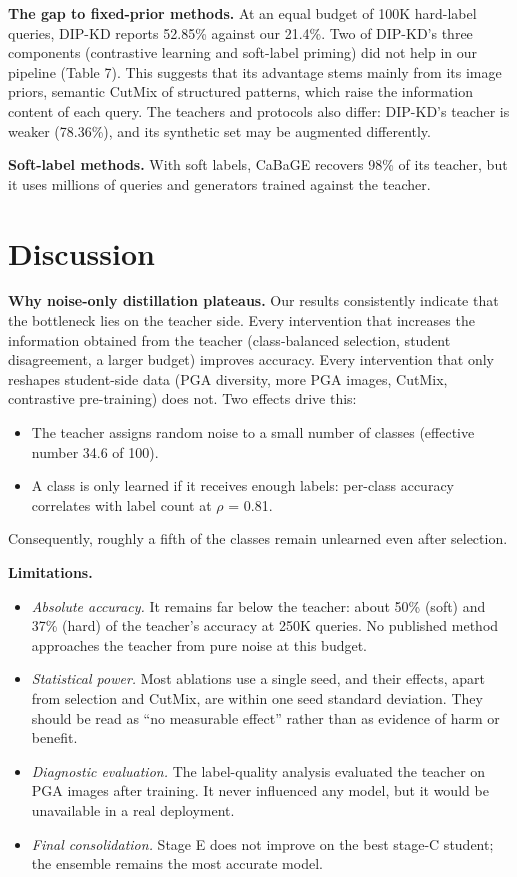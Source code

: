 \documentclass[
  10pt,
]{article}
\providecommand{\tightlist}{%
  \setlength{\itemsep}{0pt}\setlength{\parskip}{0pt}}
\begin{document}
\textbf{The gap to fixed-prior methods.} At an equal budget of 100K
hard-label queries, DIP-KD reports 52.85\% against our 21.4\%. Two of
DIP-KD's three components (contrastive learning and soft-label priming)
did not help in our pipeline (Table 7). This suggests that its advantage
stems mainly from its image priors, semantic CutMix of structured
patterns, which raise the information content of each query. The
teachers and protocols also differ: DIP-KD's teacher is weaker
(78.36\%), and its synthetic set may be augmented differently.

\textbf{Soft-label methods.} With soft labels, CaBaGE recovers 98\% of
its teacher, but it uses millions of queries and generators trained
against the teacher.

\hypertarget{discussion}{%
\section{Discussion}\label{discussion}}

\textbf{Why noise-only distillation plateaus.} Our results consistently
indicate that the bottleneck lies on the teacher side. Every
intervention that increases the information obtained from the teacher
(class-balanced selection, student disagreement, a larger budget)
improves accuracy. Every intervention that only reshapes student-side
data (PGA diversity, more PGA images, CutMix, contrastive pre-training)
does not. Two effects drive this:

\begin{itemize}
\tightlist
\item
  The teacher assigns random noise to a small number of classes
  (effective number 34.6 of 100).
\item
  A class is only learned if it receives enough labels: per-class
  accuracy correlates with label count at \(\rho\) = 0.81.
\end{itemize}

Consequently, roughly a fifth of the classes remain unlearned even after
selection.

\textbf{Limitations.}

\begin{itemize}
\tightlist
\item
  \emph{Absolute accuracy.} It remains far below the teacher: about 50\%
  (soft) and 37\% (hard) of the teacher's accuracy at 250K queries. No
  published method approaches the teacher from pure noise at this
  budget.
\item
  \emph{Statistical power.} Most ablations use a single seed, and their
  effects, apart from selection and CutMix, are within one seed standard
  deviation. They should be read as ``no measurable effect'' rather than
  as evidence of harm or benefit.
\item
  \emph{Diagnostic evaluation.} The label-quality analysis evaluated the
  teacher on PGA images after training. It never influenced any model,
  but it would be unavailable in a real deployment.
\item
  \emph{Final consolidation.} Stage E does not improve on the best
  stage-C student; the ensemble remains the most accurate model.
\end{itemize}
\end{document}

